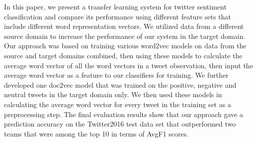 In this paper, we present a transfer learning system for twitter sentiment classification and compare its performance using different feature sets that include different word representation vectors. We utilized data from a different source domain to increase the performance of our system in the target domain. Our approach was based on training various word2vec models on data from the source and target domains combined, then using these models to calculate the average word vector of all the word vectors in a tweet observation, then input the average word vector as a feature to our classifiers for training. We further developed one doc2vec model that was trained on the positive, negative and neutral tweets in the target domain only. We then used these models in calculating the average word vector for every tweet in the training set as a preprocessing step. The final evaluation results show that our approach gave a prediction accuracy on the Twitter2016 test data set that outperformed two teams that were among the top 10 in terms of AvgF1 scores.

